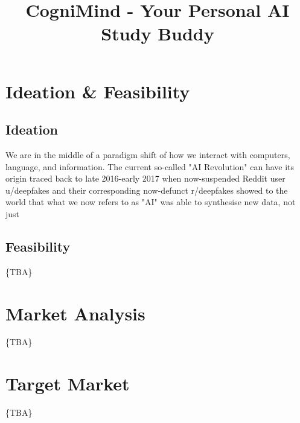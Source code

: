 \documentclass[twoside,final]{hcmut-report}
\title{CogniMind - Your Personal AI Study Buddy}
\begin{document}
\coverpage%


\tableofcontents

\clearpage
\section{Ideation \& Feasibility}
\subsection {Ideation}
We are in the middle of a paradigm shift of how we interact with computers, language, and information. The current 
so-called "AI Revolution" can have its origin traced back to late 2016-early 2017 when now-suspended Reddit user 
u/deepfakes and their corresponding now-defunct r/deepfakes showed to the world that what we now refers to as "AI" was
able to synthesise new data, not just 

\subsection {Feasibility}
\{TBA\}


\clearpage
\section{Market Analysis}

\{TBA\}

\clearpage
\section{Target Market}
\{TBA\}
\end{document}
